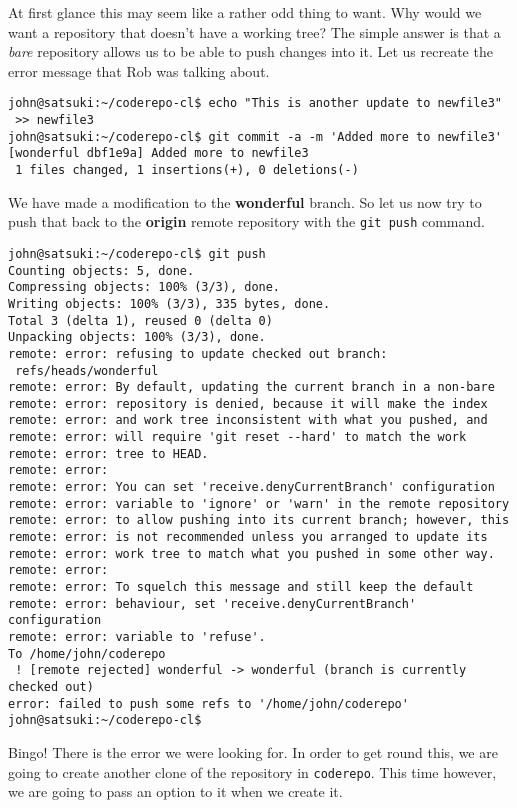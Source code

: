 At first glance this may seem like a rather odd thing to want.  Why would we want a repository that doesn't have a working tree?  The simple answer is that a \emph{bare} repository allows us to be able to push changes into it.  Let us recreate the error message that Rob was talking about.

\begin{Verbatim}[frame=leftline,framerule=1mm,fontsize=\relsize{-3}] 
john@satsuki:~/coderepo-cl$ echo "This is another update to newfile3" 
 >> newfile3
john@satsuki:~/coderepo-cl$ git commit -a -m 'Added more to newfile3'
[wonderful dbf1e9a] Added more to newfile3
 1 files changed, 1 insertions(+), 0 deletions(-)
\end{Verbatim}

We have made a modification to the \textbf{wonderful} branch.  So let us now try to push that back to the \textbf{origin} remote repository with the \texttt{git push} command.
 
\begin{Verbatim}[frame=leftline,framerule=1mm,fontsize=\relsize{-3}] 
john@satsuki:~/coderepo-cl$ git push
Counting objects: 5, done.
Compressing objects: 100% (3/3), done.
Writing objects: 100% (3/3), 335 bytes, done.
Total 3 (delta 1), reused 0 (delta 0)
Unpacking objects: 100% (3/3), done.
remote: error: refusing to update checked out branch: 
 refs/heads/wonderful
remote: error: By default, updating the current branch in a non-bare 
remote: error: repository is denied, because it will make the index 
remote: error: and work tree inconsistent with what you pushed, and 
remote: error: will require 'git reset --hard' to match the work 
remote: error: tree to HEAD.
remote: error: 
remote: error: You can set 'receive.denyCurrentBranch' configuration 
remote: error: variable to 'ignore' or 'warn' in the remote repository 
remote: error: to allow pushing into its current branch; however, this 
remote: error: is not recommended unless you arranged to update its 
remote: error: work tree to match what you pushed in some other way.
remote: error: 
remote: error: To squelch this message and still keep the default 
remote: error: behaviour, set 'receive.denyCurrentBranch' configuration 
remote: error: variable to 'refuse'.
To /home/john/coderepo
 ! [remote rejected] wonderful -> wonderful (branch is currently checked out)
error: failed to push some refs to '/home/john/coderepo'
john@satsuki:~/coderepo-cl$ 
\end{Verbatim}

Bingo!  There is the error we were looking for.  In order to get round this, we are going to create another clone of the repository in \texttt{coderepo}.  This time however, we are going to pass an option to it when we create it.

